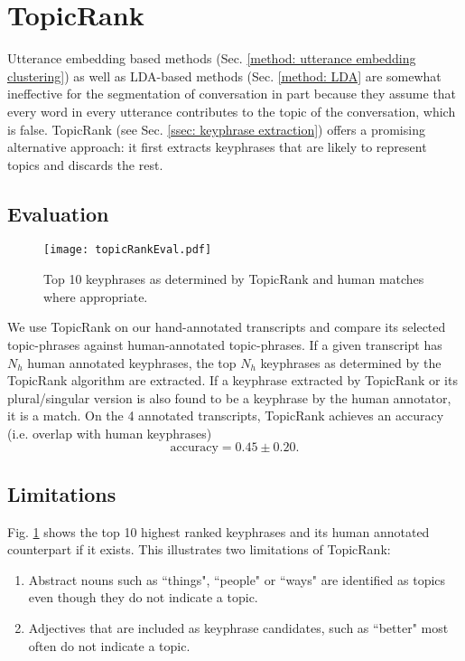 \section{TopicRank \label{method: topic rank}}

Utterance embedding based methods (Sec. \ref{method: utterance embedding clustering}) as well as LDA-based methods (Sec. \ref{method: LDA} are somewhat ineffective for the segmentation of conversation in part because they assume that every word in every utterance contributes to the topic of the conversation, which is false.
TopicRank\cite{bougouin-etal-2013-topicrank} (see Sec. \ref{ssec: keyphrase extraction}) offers a promising alternative approach: it first extracts keyphrases that are likely to represent topics and discards the rest.

\subsection{Evaluation}
\begin{figure}
    \centering
    \texttt{[image: topicRankEval.pdf]}
    \caption{Top 10 keyphrases as determined by TopicRank and human matches where appropriate.}
    \label{fig: topicrank eval}
\end{figure}
We use TopicRank on our hand-annotated transcripts and compare its selected topic-phrases against human-annotated topic-phrases. If a given transcript has $N_{h}$ human annotated keyphrases, the top $N_{h}$ keyphrases as determined by the TopicRank algorithm are extracted. If a keyphrase extracted by TopicRank or its plural/singular version is also found to be a keyphrase by the human annotator, it is a match. On the 4 annotated transcripts, TopicRank achieves an accuracy (i.e. overlap with human keyphrases)
\begin{equation}
    \text{accuracy} = 0.45 \pm 0.20.
    \label{eq: topic rank accuracy}
\end{equation}

\subsection{Limitations}
Fig. \ref{fig: topicrank eval} shows the top 10 highest ranked keyphrases and its human annotated counterpart if it exists. This illustrates two limitations of TopicRank:
\begin{enumerate}
    \item Abstract nouns such as ``things", ``people" or ``ways" are identified as topics even though they do not indicate a topic.
    \item Adjectives that are included as keyphrase candidates, such as ``better" most often do not indicate a topic.
\end{enumerate}


